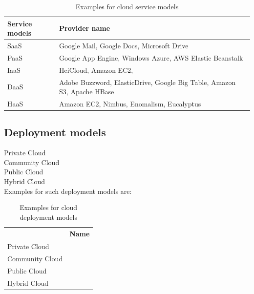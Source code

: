 \begin{table}[h]
    \label{tab:example-service-models}
    \centering
    \caption{Examples for cloud service models}
    \begin{tabular}{|l|l|}
        \hline
        Service models & Provider name                                                           \\ \hline
        SaaS           & Google Mail, Google Docs, Microsoft Drive                               \\ \hline
        PaaS           & Google App Engine, Windows Azure, AWS Elastic Beanstalk                 \\ \hline
        IaaS           & HeiCloud, Amazon EC2,                                                   \\ \hline
        DaaS           & Adobe Buzzword, ElasticDrive, Google Big Table, Amazon S3, Apache HBase \\ \hline
        HaaS           & Amazon EC2, Nimbus, Enomalism, Eucalyptus                               \\ \hline
    \end{tabular}
\end{table}

\subsection{Deployment models}
\label{subsec:cloud-deployment}

Private Cloud\\

Community Cloud\\

Public Cloud\\

Hybrid Cloud\\

Examples for such deployment models are:
\begin{table}[h]
    \centering
    \caption{Examples for cloud deployment models}
    \begin{tabular}{|l|l|}
        \hline
                        & Name \\ \hline
        Private Cloud   &      \\ \hline
        Community Cloud &      \\ \hline
        Public Cloud    &      \\ \hline
        Hybrid Cloud    &      \\ \hline
    \end{tabular}
\end{table}


